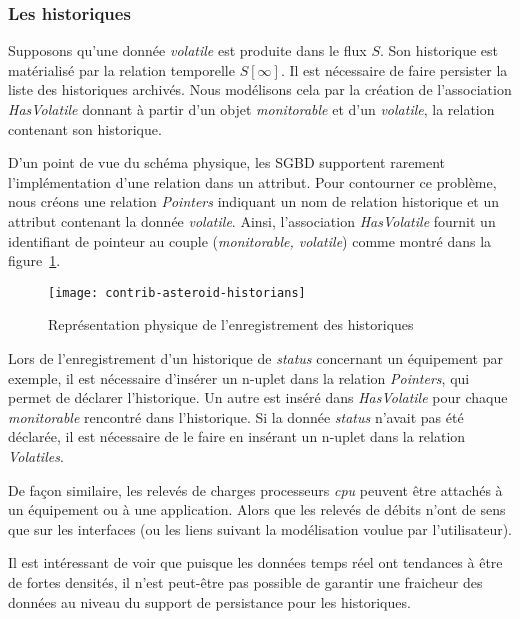 \subsubsection{Les historiques}
Supposons qu'une donnée \textit{volatile} est produite dans le flux $S$. Son historique est matérialisé par la relation temporelle $S[\infty]$. Il est nécessaire de faire persister la liste des historiques archivés. Nous modélisons cela par la création de l'association \textit{HasVolatile} donnant à partir d'un objet \textit{monitorable} et d'un \textit{volatile}, la relation contenant son historique.

D'un point de vue du schéma physique, les SGBD supportent rarement l'implémentation d'une relation dans un attribut. Pour contourner ce problème, nous créons une relation \textit{Pointers} indiquant un nom de relation historique et un attribut contenant la donnée \textit{volatile}. Ainsi, l'association \textit{HasVolatile} fournit un identifiant de pointeur au couple (\textit{monitorable, volatile}) comme montré dans la figure~\ref{fig:contrib:asteroid:theorie:volatile}.

\begin{figure}[ht]
    \centering
    \texttt{[image: contrib-asteroid-historians]}
    \caption{Représentation physique de l'enregistrement des historiques}\label{fig:contrib:asteroid:theorie:volatile}
\end{figure}

\begin{example}
	Lors de l'enregistrement d'un historique de \textit{status} concernant un équipement par exemple, il est nécessaire d'insérer un n-uplet dans la relation \textit{Pointers}, qui permet de déclarer l'historique. Un autre est inséré dans \textit{HasVolatile} pour chaque \textit{monitorable} rencontré dans l'historique. Si la donnée \textit{status} n'avait pas été déclarée, il est nécessaire de le faire en insérant un n-uplet dans la relation \textit{Volatiles}.
	
	De façon similaire, les relevés de charges processeurs \textit{cpu} peuvent être attachés à un équipement ou à une application. Alors que les relevés de débits n'ont de sens que sur les interfaces (ou les liens suivant la modélisation voulue par l'utilisateur).
\end{example}

Il est intéressant de voir que puisque les données temps réel ont tendances à être de fortes densités, il n'est peut-être pas possible de garantir une fraicheur des données au niveau du support de persistance pour les historiques.

